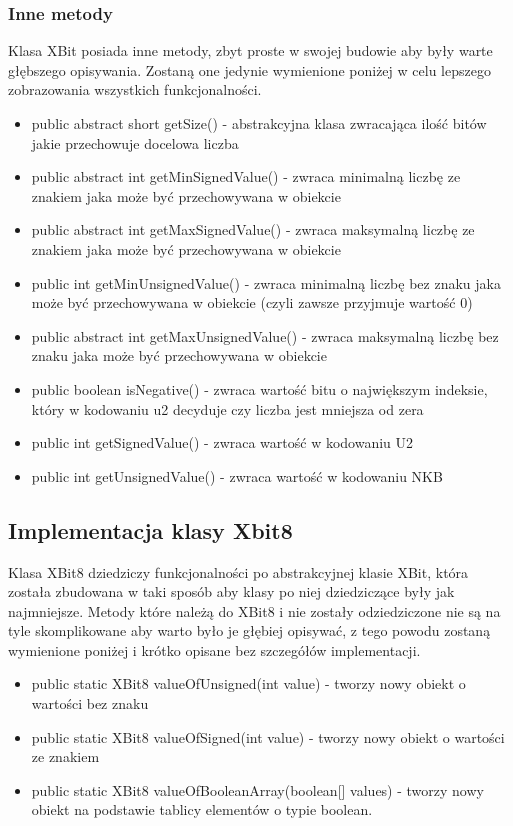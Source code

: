 	\subsubsection{Inne metody}
	Klasa XBit posiada inne metody, zbyt proste w swojej budowie aby były warte głębszego opisywania. Zostaną one jedynie wymienione poniżej w celu lepszego zobrazowania wszystkich funkcjonalności.
	\begin{itemize}  
		\item public abstract short getSize() - abstrakcyjna klasa zwracająca ilość bitów jakie przechowuje docelowa liczba
		\item public abstract int getMinSignedValue() - zwraca minimalną liczbę ze znakiem jaka może być przechowywana w obiekcie
		\item public abstract int getMaxSignedValue() - zwraca maksymalną liczbę ze znakiem jaka może być przechowywana w obiekcie
		\item public int getMinUnsignedValue() - zwraca minimalną liczbę bez znaku jaka może być przechowywana w obiekcie (czyli zawsze przyjmuje wartość 0)
		\item public abstract int getMaxUnsignedValue() - zwraca maksymalną liczbę bez znaku jaka może być przechowywana w obiekcie
		\item public boolean isNegative() - zwraca wartość bitu o największym indeksie, który w kodowaniu u2 decyduje czy liczba jest mniejsza od zera
		\item public int getSignedValue() - zwraca wartość w kodowaniu U2
		\item public int getUnsignedValue() - zwraca wartość w kodowaniu NKB
	\end{itemize}
	
	
	\subsection{Implementacja klasy Xbit8}
	Klasa XBit8 dziedziczy funkcjonalności po abstrakcyjnej klasie XBit, która została zbudowana w taki sposób aby klasy po niej dziedziczące były jak najmniejsze. Metody które należą do XBit8 i nie zostały odziedziczone nie są na tyle skomplikowane aby warto było je głębiej opisywać, z tego powodu zostaną wymienione poniżej i krótko opisane bez szczegółów implementacji.
	\begin{itemize}  
		\item public static XBit8 valueOfUnsigned(int value) - tworzy nowy obiekt o wartości bez znaku
		\item public static XBit8 valueOfSigned(int value) - tworzy nowy obiekt o wartości ze znakiem
		\item public static XBit8 valueOfBooleanArray(boolean[] values) - tworzy nowy obiekt na podstawie tablicy elementów o typie boolean.
	\end{itemize}
	
